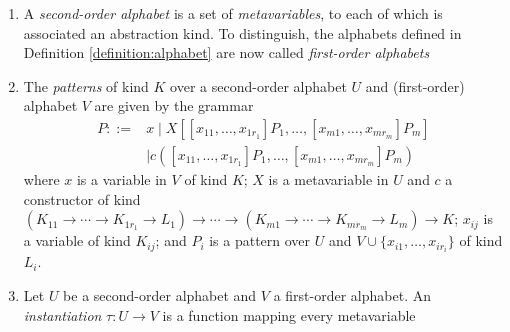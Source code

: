 \documentclass[envcountsame]{llncs}
\begin{document}
\begin{definition}
\begin{enumerate}
 \item 
 A \emph{second-order alphabet} is a set of \emph{metavariables}, to each of which is associated an abstraction kind.
 To distinguish, the alphabets defined in
 Definition \ref{definition:alphabet} are now called \emph{first-order alphabets}
\item 
The \emph{patterns} of kind $K$ over a second-order alphabet $U$ and (first-order) alphabet $V$ are given by the grammar
\begin{align*}
P ::= & x \mid X[[x_{11}, \ldots, x_{1r_1}] P_1, \ldots, [x_{m1}, \ldots, x_{mr_m}] P_m] \\
& \mid c([x_{11}, \ldots, x_{1r_1}] P_1, \ldots, [x_{m1}, \ldots, x_{mr_m}] P_m)
\end{align*}
where $x$ is a variable in $V$ of kind $K$; $X$ is a metavariable in $U$ and $c$ a constructor of kind $(K_{11} \rightarrow \cdots \rightarrow K_{1r_1} \rightarrow L_1) \rightarrow \cdots \rightarrow (K_{m1} \rightarrow \cdots
\rightarrow K_{mr_m} \rightarrow L_m) \rightarrow K$; $x_{ij}$ is a variable of kind $K_{ij}$; and $P_i$ is a pattern over $U$ and $V \cup \{ x_{i1}, \ldots, x_{ir_i} \}$
of kind $L_i$.
\item
Let $U$ be a second-order alphabet and $V$ a first-order alphabet.  An \emph{instantiation} $\tau : U \rightarrow V$ is a function mapping every metavariable

\end{enumerate}
\end{definition}
\end{document}
